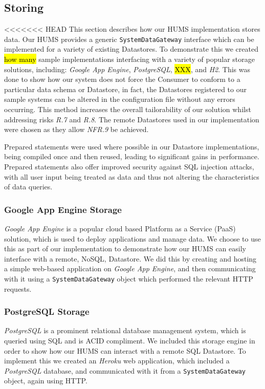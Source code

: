 \documentclass[10pt,a4paper]{article}
\begin{document}
\subsection{Storing}
\label{sec:store}
<<<<<<< HEAD
This section describes how our HUMS implementation stores data. Our HUMS provides a generic \texttt{SystemDataGateway} interface which can be implemented for a variety of existing Datastores. To demonstrate this we created \hl{how many} sample implementations interfacing with a variety of popular storage solutions, including: \emph{Google App Engine}, \emph{PostgreSQL}, \hl{XXX}, and \emph{H2}. This was done to show how our system does not force the Consumer to conform to a particular data schema or Datastore, in fact, the Datastores registered to our sample systems can be altered in the configuration file without any errors occurring. This method increases the overall tailorability of our solution whilst addressing risks \emph{R.7} and \emph{R.8}. The remote Datastores used in our implementation were chosen as they allow \emph{NFR.9} be achieved.

Prepared statements were used where possible in our Datastore implementations, being compiled once and then reused, leading to significant gains in performance. Prepared statements also offer improved security against SQL injection attacks, with all user input being treated as data and thus not altering the characteristics of data queries.

\subsubsection{Google App Engine Storage}
\emph{Google App Engine} is a popular cloud based Platform as a Service (PaaS) solution, which is used to deploy applications and manage data. We choose to use this as part of our implementation to demonstrate how our HUMS can easily interface with a remote, NoSQL, Datastore. We did this by creating and hosting a simple web-based application on \emph{Google App Engine}, and then communicating with it using a \texttt{SystemDataGateway} object which performed the relevant HTTP requests.  

\subsubsection{PostgreSQL Storage}
\emph{PostgreSQL} is a prominent relational database management system, which is queried using SQL and is ACID compliment. We included this storage engine in order to show how our HUMS can interact with a remote SQL Datastore. 
To implement this we created an \emph{Heroku} web application, which included a \emph{PostgreSQL} database, and communicated with it from a \texttt{SystemDataGateway} object, again using HTTP.
\end{document}
